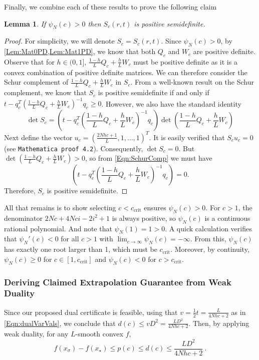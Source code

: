 \documentclass[11pt]{article}
\numberwithin{equation}{section}
\newtheorem{lemma}[thm]{Lemma}
\theoremstyle{definition}
\theoremstyle{definition}
\theoremstyle{definition}
\newcommand{\1}{\mathbf{1}}
\newcommand{\xStar}{x_\star}
\newcommand{\xSpecial}{x_\sigma}
\newcommand{\cCrit}{c_\mathrm{crit}}
\newcommand{\detDenom}[1]{2N{#1}+4N{#1}i-2i^2+1}
\begin{document}
Finally, we combine each of these results to prove the following claim
\begin{lemma}
    If $\psi_N(c)>0$ then $S_c(r,t)$ is positive semidefinite.
\end{lemma}
\begin{proof}
For simplicity, we will denote $S_c = S_c(r,t)$. Since $\psi_N(c)>0$, by \cref{Lem:Mat0PD,Lem:Mat1PD}, we know that both $Q_c$ and $W_c$ are positive definite. Observe that for $h\in(0,1]$, $\frac{1-h}{L}Q_c+\frac{h}{L}W_c$ must be positive definite as it is a convex combination of positive definite matrices. We can therefore consider the Schur complement of $\frac{1-h}{L}Q_c+\frac{h}{L}W_c$ in $S_c$. From a well-known result on the Schur complement, we know that $S_c$ is positive semidefinite if and only if $t - q_c^T\left( \frac{1-h}{L}Q_c + \frac{h}{L} W_c\right)^{-1} q_c \geq 0$. However, we also have the standard identity
    \begin{equation}\label{Eqn:SchurComp}
        \det S_c = \left(t - q_c^T\left( \frac{1-h}{L}Q_c + \frac{h}{L} W_c\right)^{-1} q_c\right) \det \left( \frac{1-h}{L}Q_c+\frac{h}{L} W_c\right)    
    \end{equation}
    Next define the vector $u_c = (\frac{2Nhc+1}{L},1,\dots,1)^T$. It is easily verified that $S_c u_c = 0$ (see \texttt{Mathematica proof 4.2}). Consequently, $\det S_c = 0$. But $\det \left( \frac{1-h}{L}Q_c+\frac{h}{L} W_c\right) > 0$, so from \eqref{Eqn:SchurComp} we must have 
    \begin{equation*}
        \left(t - q_c^T\left( \frac{1-h}{L}Q_c + \frac{h}{L} W_c\right)^{-1} q_c\right) = 0.
    \end{equation*}
    Therefore, $S_c$ is positive semidefinite.
\end{proof}
All that remains is to show selecting $c<\cCrit$ ensures $\psi_N(c)>0$. For $c>1$, the denominator $\detDenom{c}$ is always positive, so $\psi_N(c)$ is a continuous rational polynomial. And note that $\psi_N(1) = 1 > 0$. A quick calculation verifies that $\psi_N'(c)<0$ for all $c>1$ with $\lim_{c\rightarrow \infty}\psi_N(c) =-\infty$. From this, $\psi_N(c)$ has exactly one root larger than 1, which must be $\cCrit$. Moreover, by continuity, $\psi_N(c) \geq 0$ for $c \in [1,\cCrit]$ and $\psi_N(c) < 0$ for $c > \cCrit$.

\subsubsection{Deriving Claimed Extrapolation Guarantee from Weak Duality} \label{SubSubSec:Step3}
Since our proposed dual certificate is feasible, using that $v = \frac{1}{2}t = \frac{L}{4Nhc+2}$ as in \eqref{Eqn:dualVarVals}, we conclude that $d(c) \leq vD^2 = \frac{LD^2}{4Nhc+2}$. Then, by applying weak duality, for any $L$-smooth convex $f$,
\begin{equation*}
    f(\xSpecial) - f(\xStar) \leq p(c) \leq d(c) \leq \frac{LD^2}{4Nhc+2} \ .
\end{equation*}
\end{document}
